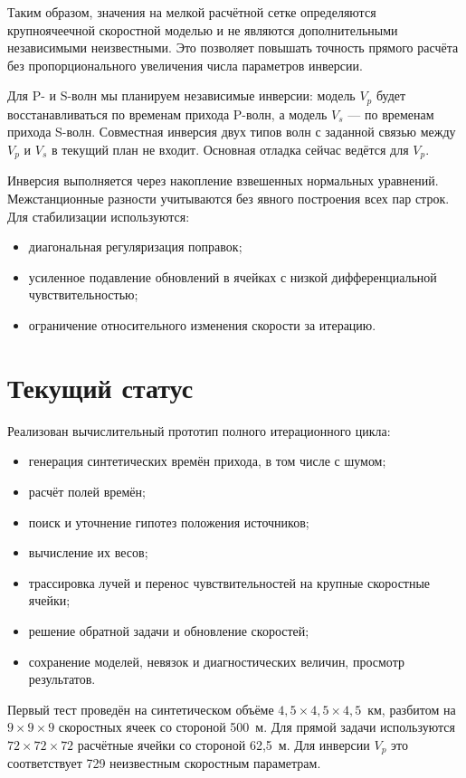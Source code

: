 \documentclass[12pt,a4paper]{article}
\begin{document}
Таким образом, значения на мелкой расчётной сетке определяются
крупноячеечной скоростной моделью и не являются дополнительными
независимыми неизвестными. Это позволяет повышать точность прямого
расчёта без пропорционального увеличения числа параметров инверсии.

Для P- и S-волн мы планируем независимые инверсии: модель
\(V_p\) будет восстанавливаться по временам прихода P-волн, а модель
\(V_s\) --- по временам прихода S-волн. Совместная инверсия двух типов
волн с заданной связью между \(V_p\) и \(V_s\) в текущий план не входит.
Основная отладка сейчас ведётся для \(V_p\).

Инверсия выполняется через накопление взвешенных нормальных уравнений.
Межстанционные разности учитываются без явного построения всех пар
строк. Для стабилизации используются:

\begin{itemize}
    \item диагональная регуляризация поправок;
    \item усиленное подавление обновлений в ячейках с низкой
    дифференциальной чувствительностью;
    \item ограничение относительного изменения скорости за итерацию.
\end{itemize}

\section*{Текущий статус}

Реализован вычислительный прототип полного итерационного цикла:

\begin{itemize}
    \item генерация синтетических времён прихода, в том числе с шумом;
    \item расчёт полей времён;
    \item поиск и уточнение гипотез положения источников;
    \item вычисление их весов;
    \item трассировка лучей и перенос чувствительностей на крупные
    скоростные ячейки;
    \item решение обратной задачи и обновление скоростей;
    \item сохранение моделей, невязок и диагностических величин,
    просмотр результатов.
\end{itemize}

Первый тест проведён на синтетическом объёме
\(4{,}5 \times 4{,}5 \times 4{,}5\)~км,
разбитом на \(9 \times 9 \times 9\) скоростных ячеек
со стороной 500~м. Для прямой задачи используются
\(72 \times 72 \times 72\) расчётные ячейки
со стороной 62{,}5~м. Для инверсии \(V_p\) это соответствует
729 неизвестным скоростным параметрам.
\end{document}
